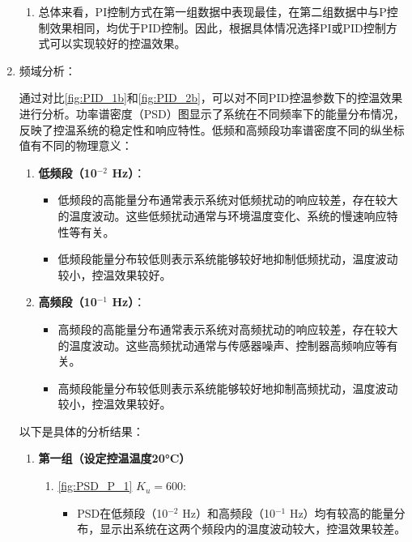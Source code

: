 \documentclass[dvipsnames, svgnames,a4paper,11pt]{article}
\begin{document}
\begin{enumerate}
\begin{enumerate}
                \item 总体来看，PI控制方式在第一组数据中表现最佳，在第二组数据中与P控制效果相同，均优于PID控制。因此，根据具体情况选择PI或PID控制方式可以实现较好的控温效果。
            \end{enumerate}

        \item 频域分析：
        
            通过对比\cref{fig:PID_1b}和\cref{fig:PID_2b}，可以对不同PID控温参数下的控温效果进行分析。功率谱密度（PSD）图显示了系统在不同频率下的能量分布情况，反映了控温系统的稳定性和响应特性。低频和高频段功率谱密度不同的纵坐标值有不同的物理意义：

            \begin{enumerate}
                \item \textbf{低频段（10$^{-2}$ Hz）}：
                \begin{itemize}
                    \item 低频段的高能量分布通常表示系统对低频扰动的响应较差，存在较大的温度波动。这些低频扰动通常与环境温度变化、系统的慢速响应特性等有关。
                    \item 低频段能量分布较低则表示系统能够较好地抑制低频扰动，温度波动较小，控温效果较好。
                \end{itemize}
            
                \item \textbf{高频段（10$^{-1}$ Hz）}：
                \begin{itemize}
                    \item 高频段的高能量分布通常表示系统对高频扰动的响应较差，存在较大的温度波动。这些高频扰动通常与传感器噪声、控制器高频响应等有关。
                    \item 高频段能量分布较低则表示系统能够较好地抑制高频扰动，温度波动较小，控温效果较好。
                \end{itemize}
            \end{enumerate}
        
            以下是具体的分析结果：
        
        \begin{enumerate}
            \item \textbf{第一组（设定控温温度20°C）}
            \begin{enumerate}
                \item \cref{fig:PSD_P_1} \( K_u = 600 \):
                \begin{itemize}
                    \item PSD在低频段（10$^{-2}$ Hz）和高频段（10$^{-1}$ Hz）均有较高的能量分布，显示出系统在这两个频段内的温度波动较大，控温效果较差。
                \end{itemize}
                

\end{enumerate}
\end{enumerate}
\end{enumerate}
\end{document}
